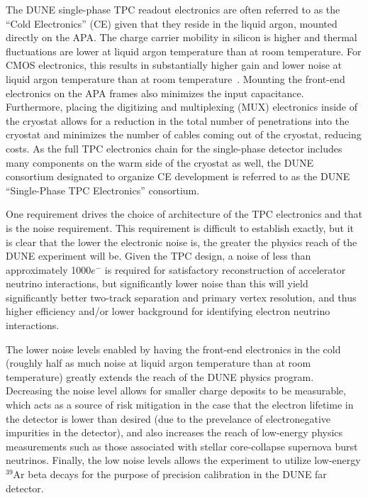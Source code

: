 The DUNE single-phase TPC readout electronics are often referred to as the ``Cold Electronics'' (CE) given that they reside in the liquid argon, mounted directly on the APA.  The charge carrier mobility in silicon is higher and thermal fluctuations are lower at liquid argon temperature than at room temperature.  For CMOS electronics, this results in substantially higher gain and lower noise at liquid argon temperature than at room temperature~\cite{LArCMOS}.  Mounting the front-end electronics on the APA frames also minimizes the input capacitance.  Furthermore, placing the digitizing and multiplexing (MUX) electronics inside of the cryostat allows for a reduction in the total number of penetrations into the cryostat and minimizes the number of cables coming out of the cryostat, reducing costs.  As the full TPC electronics chain for the single-phase detector includes many components on the warm side of the cryostat as well, the DUNE consortium designated to organize CE development is referred to as the DUNE ``Single-Phase TPC Electronics'' consortium.

One requirement drives the choice of architecture of the TPC electronics and that is the noise requirement. This requirement is difficult to establish exactly, but it is clear that the lower the electronic noise is, the greater the physics reach of the DUNE experiment will be.  Given the TPC design, a noise of less than approximately 1000$e^-$ is required for satisfactory reconstruction of accelerator neutrino interactions, but significantly lower noise than this will yield significantly better two-track separation and primary vertex resolution, and thus higher efficiency and/or lower background for identifying electron neutrino interactions.

The lower noise levels enabled by having the front-end electronics in the cold (roughly half as much noise at liquid argon temperature than at room temperature) greatly extends the reach of the DUNE physics program.  Decreasing the noise level allows for smaller charge deposits to be measurable, which acts as a source of risk mitigation in the case that the electron lifetime in the detector is lower than desired (due to the prevelance of electronegative impurities in the detector), and also increases the reach of low-energy physics measurements such as those associated with stellar core-collapse supernova burst neutrinos.  Finally, the low noise levels allows the experiment to utilize low-energy $\mathrm{{}^{39}Ar}$ beta decays for the purpose of precision calibration in the DUNE far detector.

